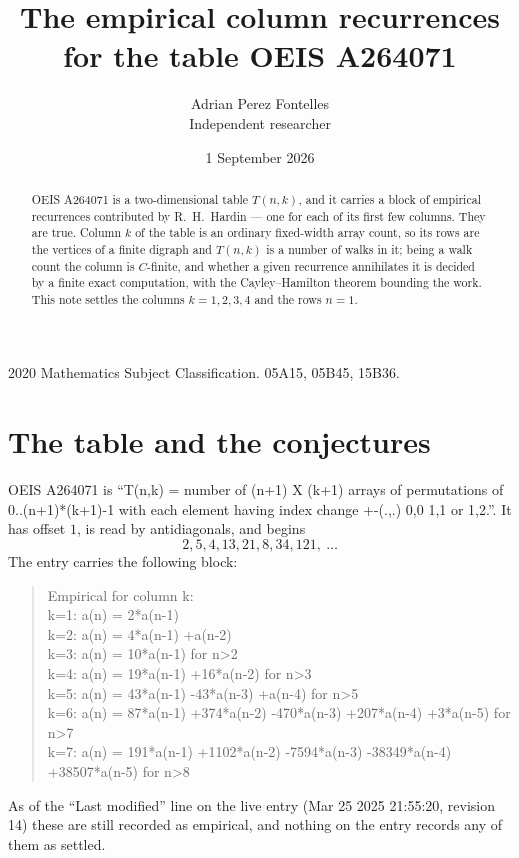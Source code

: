 \documentclass[11pt,a4paper]{article}
\title{The empirical column recurrences for the table OEIS A264071}
\author{Adrian Perez Fontelles\\ \small Independent researcher}
\date{1 September 2026}
\theoremstyle{plain}
\theoremstyle{definition}
\begin{document}
\maketitle

\begin{abstract}
OEIS A264071 is a two-dimensional table $T(n,k)$, and it carries a block of empirical
recurrences contributed by R.~H.~Hardin --- one for each of its first few columns. They are
true. Column $k$ of the table is an ordinary fixed-width array count, so its rows are the
vertices of a finite digraph and $T(n,k)$ is a number of walks in it; being a walk count the
column is $C$-finite, and whether a given recurrence annihilates it is decided by a finite
exact computation, with the Cayley--Hamilton theorem bounding the work. This note settles the columns $k=1, 2, 3, 4$ and the rows $n=1$.
\end{abstract}

\noindent\small 2020 Mathematics Subject Classification. 05A15, 05B45, 15B36.\normalsize

\section{The table and the conjectures}

OEIS A264071 is ``T(n,k) = number of (n+1) X (k+1) arrays of permutations of 0..(n+1)*(k+1)-1 with each element having index change +-(.,.) 0,0 1,1 or 1,2.''. It has offset $1$, is
read by antidiagonals, and begins
\[
2, 5, 4, 13, 21, 8, 34, 121,\ \dots
\]
The entry carries the following block:
\begin{quote}\small
Empirical for column k:\\
k=1: a(n) = 2*a(n-1)\\
k=2: a(n) = 4*a(n-1) +a(n-2)\\
k=3: a(n) = 10*a(n-1) for n>2\\
k=4: a(n) = 19*a(n-1) +16*a(n-2) for n>3\\
k=5: a(n) = 43*a(n-1) -43*a(n-3) +a(n-4) for n>5\\
k=6: a(n) = 87*a(n-1) +374*a(n-2) -470*a(n-3) +207*a(n-4) +3*a(n-5) for n>7\\
k=7: a(n) = 191*a(n-1) +1102*a(n-2) -7594*a(n-3) -38349*a(n-4) +38507*a(n-5) for n>8\\
\end{quote}
As of the ``Last modified'' line on the live entry (Mar 25 2025 21:55:20, revision 14) these are still
recorded as empirical, and nothing on the entry records any of them as settled.
\end{document}
